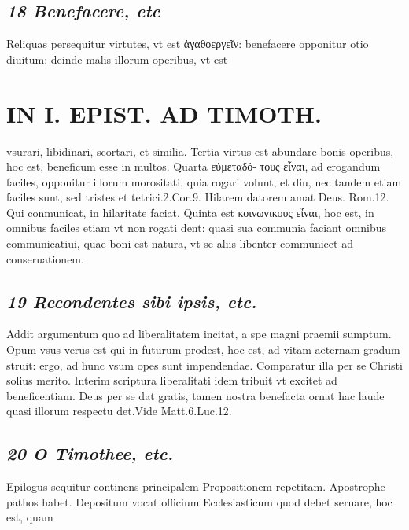 \documentclass{article}
\begin{document}
\begin{pages}
\subsection*{\textit{18 Benefacere, etc }}\pstart Reliquas persequitur virtutes, vt est ἀγαθοεργεῖν: benefacere opponitur otio diuitum: deinde malis illorum operibus, vt est  \pend
\section*{IN I. EPIST. AD TIMOTH. }
\marginpar{[ p.169 ]}\pstart vsurari, libidinari, scortari, et similia. Tertia virtus est abundare bonis operibus, hoc est, beneficum esse in multos. Quarta εὐμεταδό- τους εἶναι, ad erogandum faciles, opponitur illorum morositati, quia rogari volunt, et diu, nec tandem etiam faciles sunt, sed tristes et tetrici.2.Cor.9. Hilarem datorem amat Deus. Rom.12. Qui conmunicat, in hilaritate faciat. Quinta est κοινωνικους εἶναι, hoc est, in omnibus faciles etiam vt non rogati dent: quasi sua communia faciant omnibus communicatiui, quae boni est natura, vt se aliis libenter communicet ad conseruationem.  \pend
{}
{}
\subsection*{\textit{19 Recondentes sibi ipsis, etc. }}\pstart Addit argumentum quo ad liberalitatem incitat, a spe magni praemii sumptum. Opum vsus verus est qui in futurum prodest, hoc est, ad vitam aeternam gradum struit: ergo, ad hunc vsum opes sunt impendendae. Comparatur illa per se Christi solius merito. Interim scriptura liberalitati idem tribuit vt excitet ad beneficentiam. Deus per se dat gratis, tamen nostra benefacta ornat hac laude quasi illorum respectu det.Vide Matt.6.Luc.12.  \pend
{}
{}
\subsection*{\textit{20 O Timothee, etc. }}\pstart Epilogus sequitur continens principalem Propositionem repetitam. Apostrophe pathos habet. Depositum vocat officium Ecclesiasticum quod debet seruare, hoc est, quam  \pend

\end{pages}
\end{document}

